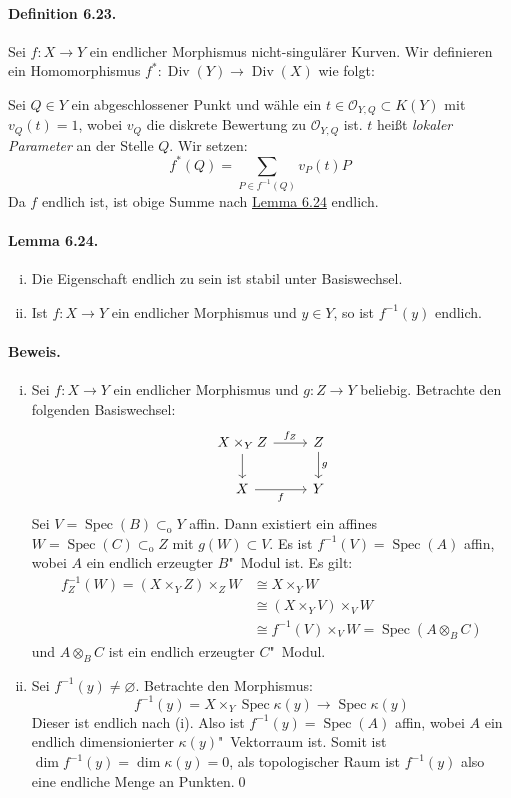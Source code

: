\paragraph{Definition 6.23.}\label{6.23} Sei $f:X\to Y$ ein endlicher Morphismus nicht-singulärer Kurven. Wir definieren ein Homomorphismus $f^\ast:\operatorname{Div}(Y)\to\operatorname{Div}(X)$ wie folgt:

Sei $Q\in Y$ ein abgeschlossener Punkt und wähle ein $t\in\mathcal{O}_{Y,Q}\subset K(Y)$ mit $v_Q(t)=1$, wobei $v_Q$ die diskrete Bewertung zu $\mathcal{O}_{Y,Q}$ ist. $t$ heißt \textit{lokaler Parameter} an der Stelle $Q$. Wir setzen:
\[f^\ast(Q) = \sum_{P\in f^{-1}(Q)}v_P(t)P \]
Da $f$ endlich ist, ist obige Summe nach \hyperref[6.24]{Lemma 6.24} endlich.

\paragraph{Lemma 6.24.}\label{6.24} \begin{enumerate}[(i)]
\item Die Eigenschaft endlich zu sein ist stabil unter Basiswechsel.
\item Ist $f:X\to Y$ ein endlicher Morphismus und $y\in Y$, so ist $f^{-1}(y)$ endlich.
\end{enumerate}

\paragraph{Beweis.} \begin{enumerate}[(i)]
\item Sei $f:X\to Y$ ein endlicher Morphismus und $g:Z\to Y$ beliebig. Betrachte den folgenden Basiswechsel:
\[\begin{tikzcd}
X\times_YZ \dar\rar["f_Z"] & Z\dar["g"]\\
X \rar["f"'] & Y
\end{tikzcd} \]
Sei $V=\operatorname{Spec}(B)\subset_\text{o}Y$ affin. Dann existiert ein affines $W=\operatorname{Spec}(C)\subset_\text{o}Z$ mit $g(W)\subset V$. Es ist $f^{-1}(V)=\operatorname{Spec}(A)$ affin, wobei $A$ ein endlich erzeugter $B$"~Modul ist. Es gilt:
\begin{align*}
f_Z^{-1}(W)= (X\times_YZ)\times_ZW &\cong X\times_YW \\
&\cong (X\times_YV)\times_VW\\
&\cong f^{-1}(V)\times_VW=\operatorname{Spec}(A\otimes_BC)
\end{align*}
und $A\otimes_BC$ ist ein endlich erzeugter $C$"~Modul.
\item Sei $f^{-1}(y)\neq\varnothing$. Betrachte den Morphismus:
\[f^{-1}(y)= X\times_Y\operatorname{Spec}\kappa(y)\to\operatorname{Spec}\kappa(y) \]
Dieser ist endlich nach (i). Also ist $f^{-1}(y)=\operatorname{Spec}(A)$ affin, wobei $A$ ein endlich dimensionierter $\kappa(y)$"~Vektorraum ist. Somit ist $\dim f^{-1}(y)=\dim\kappa(y)= 0$, als topologischer Raum ist $f^{-1}(y)$ also eine endliche Menge an Punkten.\qed
\end{enumerate}

